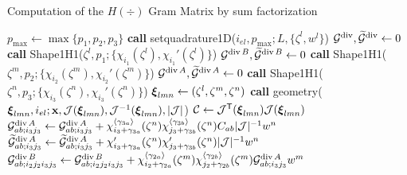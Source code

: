 \begin{algorithm}[ht!]
\caption{Computation of the $H(\div)$ Gram Matrix by sum factorization}\label{algo:hdivtensor}
\begin{algorithmic}
\State $p_{\max}\gets\max\{p_1,p_2,p_3\}$
\State\textbf{call }setquadrature1D($i_{el},p_{\max};L,\{\zeta^l,w^l\}$)
\State $\mathcal{G}^{\operatorname{div}},\widetilde{\mathcal{G}}^{\operatorname{div}}\gets 0$
    \State\textbf{call } Shape1H1($\zeta^l,p_1;\{\chi_{i_1}(\zeta^l),\chi_{i_1}'(\zeta^l)\}$) 
            \State $\mathcal{G}^{\operatorname{div} B},\widetilde{\mathcal{G}}^{\operatorname{div} B}\gets 0$
                \State\textbf{call } Shape1H1($\zeta^m,p_2;\{\chi_{i_2}(\zeta^m),\chi_{i_2}'(\zeta^m)\}$) 
                \State $\mathcal{G}^{\operatorname{div} A},\widetilde{\mathcal{G}}^{\operatorname{div} A}\gets 0$
                    \State\textbf{call } Shape1H1($\zeta^n,p_3;\{\chi_{i_3}(\zeta^n),\chi_{i_3}'(\zeta^n)\}$) 
                    \State $\boldsymbol{\xi}_{lmn}\gets (\zeta^l,\zeta^m,\zeta^n)$
                    \State\textbf{call } geometry( $\boldsymbol{\xi}_{lmn},i_{el};\mathbf{x},\mathcal{J}(\boldsymbol{\xi}_{lmn}),\mathcal{J}^{-1}(\boldsymbol{\xi}_{lmn}),|\mathcal{J}|$)
                    \State $\mathcal{C}\gets\mathcal{J}^{\mathsf{T}}(\boldsymbol{\xi}_{lmn})\mathcal{J}(\boldsymbol{\xi}_{lmn})$
                            \State$\mathcal{G}_{ab;i_3j_3}^{\operatorname{div} A}\gets \mathcal{G}_{ab;i_3j_3}^{\operatorname{div} A} + \chi_{i_3+\gamma_{3a}}^{\langle\gamma_{3a}\rangle}(\zeta^n) \chi_{j_3+\gamma_{3b}}^{\langle\gamma_{3b}\rangle}(\zeta^n) C_{ab} |\mathcal{J}|^{-1} w^n$ 
                            \State$\widetilde{\mathcal{G}}_{ab;i_3j_3}^{\operatorname{div} A}\gets \widetilde{\mathcal{G}}_{ab;i_3j_3}^{\operatorname{div} A} + \chi_{i_3+\gamma_{3a}}'(\zeta^n) \chi_{j_3+\gamma_{3b}}'(\zeta^n) |\mathcal{J}|^{-1} w^n$
                        \EndIf
                    \EndFor
                \EndFor
                                    \State$\mathcal{G}_{ab;i_2j_2i_3j_3}^{\operatorname{div} B}\gets \mathcal{G}_{ab;i_2j_2i_3j_3}^{\operatorname{div} B} + \chi_{i_2+\gamma_{2a}}^{\langle\gamma_{2a}\rangle}(\zeta^m) \chi_{j_2+\gamma_{2b}}^{\langle\gamma_{2b}\rangle}(\zeta^m) \mathcal{G}_{ab;i_3j_3}^{\operatorname{div} A} w^m$ \Comment{(\ref{GB_hdiv})}

\end{algorithmic}
\end{algorithm}
